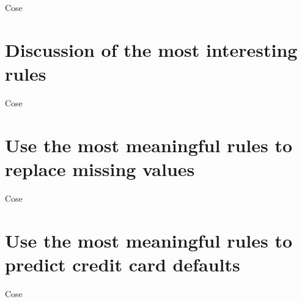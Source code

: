 Cose

\section{Discussion of the most interesting rules}

Cose

\section{Use the most meaningful rules to replace missing values}

Cose

\section{Use the most meaningful rules to predict credit card defaults}

Cose
